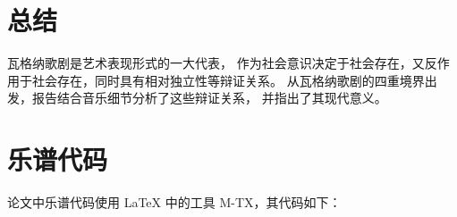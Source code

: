 \documentclass[10pt,a4paper,twocolumn]{article}
\begin{document}
  \section{总结}

    瓦格纳歌剧是艺术表现形式的一大代表，
    作为社会意识决定于社会存在，又反作用于社会存在，同时具有相对独立性等辩证关系。
    从瓦格纳歌剧的四重境界出发，报告结合音乐细节分析了这些辩证关系，
    并指出了其现代意义。

  \appendix

  \section{乐谱代码}

    论文中乐谱代码使用 \LaTeX{} 中的工具 M-TX，其代码如下：

    
    
    
    
    
    

  \printbibliography[title={参考文献}]
\end{document}
